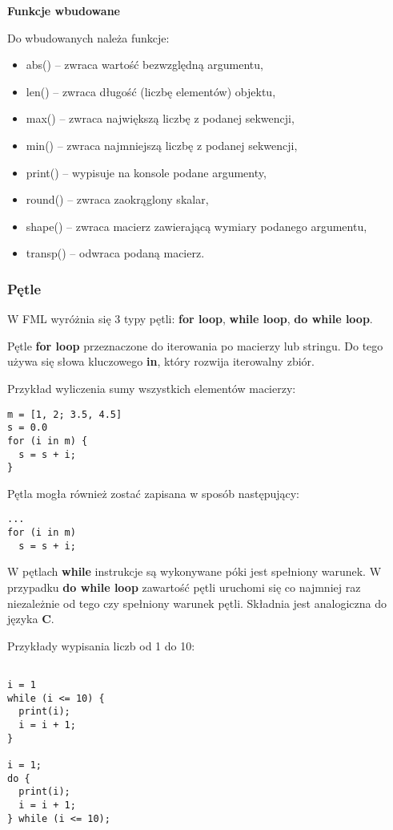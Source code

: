 \documentclass[12pt,a4paper]{article}
\begin{document}
\textbf{Funkcje wbudowane}

\medskip
Do wbudowanych należa funkcje:

\begin{itemize}

  \item abs() -- zwraca wartość bezwzględną argumentu,
  \item len() -- zwraca długość (liczbę elementów) objektu,
  \item max() -- zwraca największą liczbę z podanej sekwencji,
  \item min() -- zwraca najmniejszą liczbę z podanej sekwencji,
  \item print() -- wypisuje na konsole podane argumenty,
  \item round() -- zwraca zaokrąglony skalar,
  \item shape() -- zwraca macierz zawierającą wymiary podanego argumentu,
  \item transp() -- odwraca podaną macierz.
  
\end{itemize}

\subsubsection{Pętle}

W FML wyróżnia się 3 typy pętli: \textbf{for loop}, \textbf{while loop}, \textbf{do while loop}.

\medskip

Pętle \textbf{for loop} przeznaczone do iterowania po macierzy lub stringu. Do tego używa się słowa kluczowego \textbf{in}, który rozwija iterowalny zbiór.

\medskip
Przykład wyliczenia sumy wszystkich elementów macierzy:

\begin{lstlisting}
m = [1, 2; 3.5, 4.5]
s = 0.0
for (i in m) {
  s = s + i;
}
\end{lstlisting}

Pętla mogła również zostać zapisana w sposób następujący:
\begin{lstlisting}
...
for (i in m)
  s = s + i;
\end{lstlisting}

W pętlach \textbf{while} instrukcje są wykonywane póki jest spełniony warunek. W przypadku \textbf{do while loop} zawartość pętli uruchomi się co najmniej raz niezależnie od tego czy spełniony warunek pętli. Składnia jest analogiczna do języka \textbf{C}.

\medskip
Przykłady wypisania liczb od 1 do 10:

\begin{lstlisting}

i = 1
while (i <= 10) {
  print(i);
  i = i + 1;
}

i = 1;
do {
  print(i);
  i = i + 1;
} while (i <= 10);

\end{lstlisting}
\end{document}
